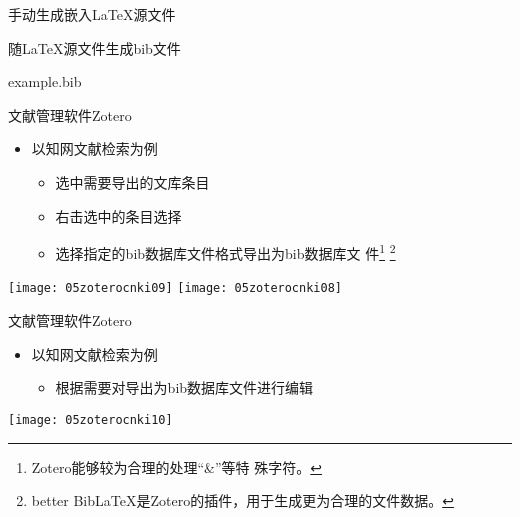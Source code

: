 \documentclass[fontset = none, t]{ctexbeamer}
\begin{document}
\begin{frame}[fragile]{手动生成}{嵌入\LaTeX 源文件}
\begin{spacing}{1.3}
\begin{center}
\begin{minipage}[h]{0.55\linewidth}
\begin{textcb}{随\LaTeX 源文件生成bib文件}
\begin{filecontents}{example.bib}
\begin{frame}[fragile]{文献管理软件}{Zotero}
  \begin{spacing}{1.2}
    \begin{itemize}
    \item 以\alert{知网}文献检索为例
      \begin{itemize}
      \item 选中需要导出的文库条目
      \item 右击选中的条目选择
      \item 选择指定的bib数据库文件格式导出为bib数据库文
        件\footnote[frame,2]{Zotero能够较为合理的处理\enquote{\&}等特
          殊字符。} \footnote[frame,3]{better
          BibLaTeX是Zotero的插件，用于生成更为合理的文件数据。}
      \end{itemize}
    \end{itemize}    
    \begin{center}
      \texttt{[image: 05zoterocnki09]}\quad
      \texttt{[image: 05zoterocnki08]}
    \end{center}
  \end{spacing}
\end{frame}

\begin{frame}[fragile]{文献管理软件}{Zotero}
  \begin{spacing}{1.2}
    \begin{itemize}
    \item 以\alert{知网}文献检索为例
      \begin{itemize}
      \item 根据需要对导出为bib数据库文件进行编辑
      \end{itemize}
    \end{itemize}    
    \begin{center}
      \texttt{[image: 05zoterocnki10]}
    \end{center}
  \end{spacing}
\end{frame}

\end{filecontents}
\end{textcb}
\end{minipage}
\end{center}
\end{spacing}
\end{frame}
\end{document}
